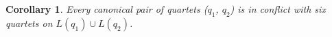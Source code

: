 \documentclass[10pt,a4paper]{article}
\newcommand{\add}[1]{{\color{blue} #1}}
\newtheorem{corollary}{Corollary}[theorem]
\begin{document}

\begin{corollary}
\label{cor:six_conflict}
Every canonical pair of quartets ($q_1$, $q_2$) is in conflict with six quartets on $L(q_1) \cup L(q_2)$.
\end{corollary}




\end{document}
